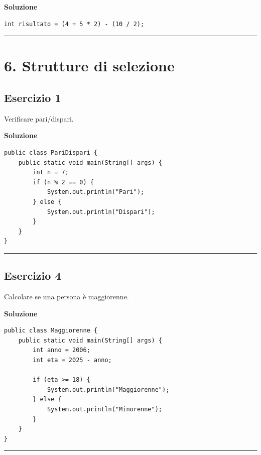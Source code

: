 \documentclass[
]{article}
\begin{document}
\textbf{Soluzione}

\begin{verbatim}
int risultato = (4 + 5 * 2) - (10 / 2);
\end{verbatim}

\begin{center}\rule{0.5\linewidth}{0.5pt}\end{center}

\section{6. Strutture di selezione}\label{strutture-di-selezione}

\subsection{Esercizio 1}\label{esercizio-1-5}

Verificare pari/dispari.

\textbf{Soluzione}

\begin{verbatim}
public class PariDispari {
    public static void main(String[] args) {
        int n = 7;
        if (n % 2 == 0) {
            System.out.println("Pari");
        } else {
            System.out.println("Dispari");
        }
    }
}
\end{verbatim}

\begin{center}\rule{0.5\linewidth}{0.5pt}\end{center}

\subsection{Esercizio 4}\label{esercizio-4-4}

Calcolare se una persona è maggiorenne.

\textbf{Soluzione}

\begin{verbatim}
public class Maggiorenne {
    public static void main(String[] args) {
        int anno = 2006;
        int eta = 2025 - anno;

        if (eta >= 18) {
            System.out.println("Maggiorenne");
        } else {
            System.out.println("Minorenne");
        }
    }
}
\end{verbatim}

\begin{center}\rule{0.5\linewidth}{0.5pt}\end{center}
\end{document}
